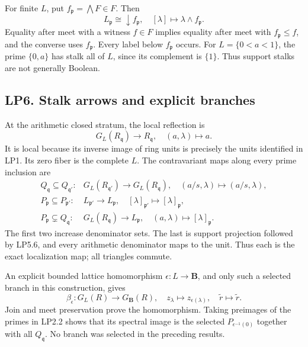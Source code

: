 For finite \(L\), put \(f_{\mathfrak p}=\bigwedge F\in F\). Then \[
L_{\mathfrak p}\cong\downarrow f_{\mathfrak p},\quad
[\lambda]\mapsto\lambda\wedge f_{\mathfrak p}.
\tag{LP5.7}
\] Equality after meet with a witness \(f\in F\) implies equality after
meet with \(f_{\mathfrak p}\le f\), and the converse uses
\(f_{\mathfrak p}\). Every label below \(f_{\mathfrak p}\) occurs. For
\(L=\{0<a<1\}\), the prime \(\{0,a\}\) has stalk all of \(L\), since its
complement is \(\{1\}\). Thus support stalks are not generally Boolean.

\subsection{LP6. Stalk arrows and explicit
branches}\label{lp6.-stalk-arrows-and-explicit-branches}

At the arithmetic closed stratum, the local reflection is \[
G_L(R_{\mathfrak q})\to R_{\mathfrak q},\quad(a,\lambda)\mapsto a.
\tag{LP6.1}
\] It is local because its inverse image of ring units is precisely the
units identified in LP1. Its zero fiber is the complete \(L\). The
contravariant maps along every prime inclusion are \[
\begin{array}{ll}
Q_{\mathfrak q}\subseteq Q_{\mathfrak q'}:
&G_L(R_{\mathfrak q'})\to G_L(R_{\mathfrak q}),\quad(a/s,\lambda)\mapsto(a/s,\lambda),\\
P_{\mathfrak p}\subseteq P_{\mathfrak p'}:
&L_{\mathfrak p'}\to L_{\mathfrak p},\quad[\lambda]_{\mathfrak p'}\mapsto[\lambda]_{\mathfrak p},\\
P_{\mathfrak p}\subsetneq Q_{\mathfrak q}:
&G_L(R_{\mathfrak q})\to L_{\mathfrak p},\quad(a,\lambda)\mapsto[\lambda]_{\mathfrak p}.
\end{array}\tag{LP6.2}
\] The first two increase denominator sets. The last is support
projection followed by LP5.6, and every arithmetic denominator maps to
the unit. Thus each is the exact localization map; all triangles
commute.

An explicit bounded lattice homomorphism \(\epsilon:L\to\mathbf B\), and
only such a selected branch in this construction, gives \[
\beta_\epsilon:G_L(R)\to G_{\mathbf B}(R),\quad
z_\lambda\mapsto z_{\epsilon(\lambda)},\quad\widetilde r\mapsto\widetilde r.
\tag{LP6.3}
\] Join and meet preservation prove the homomorphism. Taking preimages
of the primes in LP2.2 shows that its spectral image is the selected
\(P_{\epsilon^{-1}(0)}\) together with all \(Q_{\mathfrak q}\). No
branch was selected in the preceding results.

